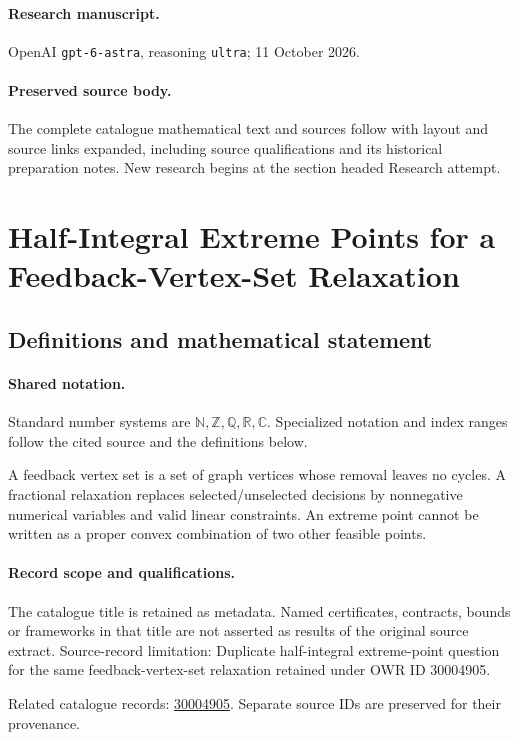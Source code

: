 \documentclass[11pt]{article}
\begin{document}
\paragraph{Research manuscript.} OpenAI \texttt{gpt-6-astra}, reasoning \texttt{ultra}; 11 October 2026.
\paragraph{Preserved source body.} The complete catalogue mathematical text and sources follow with layout and source links expanded, including source qualifications and its historical preparation notes. New research begins at the section headed Research attempt.

\section{Half-Integral Extreme Points for a Feedback-Vertex-Set Relaxation}\label{statement}

\subsection{Definitions and mathematical statement}

\paragraph{Shared notation.}Standard number systems are $\mathbb N,\mathbb Z,\mathbb Q,\mathbb R,\mathbb C$. Specialized notation and index ranges follow the cited source and the definitions below.


A feedback vertex set is a set of graph vertices whose removal leaves no cycles. A fractional relaxation replaces selected/unselected decisions by nonnegative numerical variables and valid linear constraints. An extreme point cannot be written as a proper convex combination of two other feasible points.
\paragraph{Record scope and qualifications.}
The catalogue title is retained as metadata. Named certificates, contracts, bounds or frameworks in that title are not asserted as results of the original source extract.
Source-record limitation: Duplicate half-integral extreme-point question for the same feedback-vertex-set relaxation retained under OWR ID 30004905.

Related catalogue records: \href{https://mehmetmars7.github.io/Erdosproblems-llm-hunter/problem.html?type=open_problems&id=30004905}{30004905}. Separate source IDs are preserved for their provenance.
\end{document}
